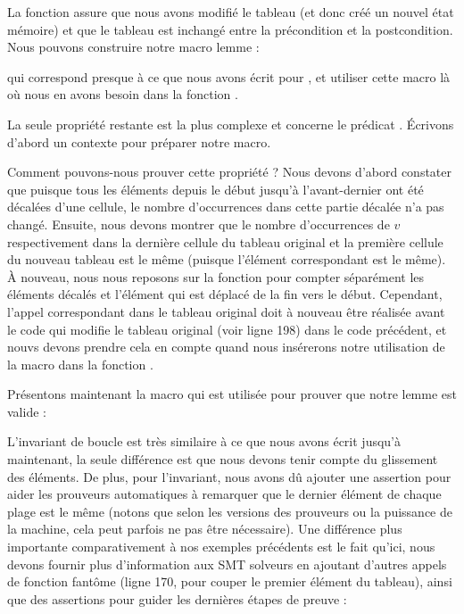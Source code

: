 

La fonction  assure que nous avons
modifié le tableau (et donc créé un nouvel état mémoire) et que le tableau est
inchangé entre la précondition et la postcondition. Nous pouvons construire
notre macro lemme :




qui correspond presque à ce que nous avons écrit pour ,
et utiliser cette macro là où nous en avons besoin dans la fonction
.




La seule propriété restante est la plus complexe et concerne le prédicat
. Écrivons d'abord un contexte pour préparer notre
macro.




Comment pouvons-nous prouver cette propriété ? Nous devons d'abord constater
que puisque tous les éléments depuis le début jusqu'à l'avant-dernier ont été
décalées d'une cellule, le nombre d'occurrences dans cette partie décalée n'a
pas changé. Ensuite, nous devons montrer que le nombre d'occurrences de $v$
respectivement dans la dernière cellule du tableau original et la première
cellule du nouveau tableau est le même (puisque l'élément correspondant est le
même). À nouveau, nous nous reposons sur la fonction  pour compter
séparément les éléments décalés et l'élément qui est déplacé de la fin vers le
début. Cependant, l'appel correspondant dans le tableau original doit à nouveau
être réalisée avant le code qui modifie le tableau original (voir ligne 198) dans
le code précédent, et nouvs devons prendre cela en compte quand nous insérerons
notre utilisation de la macro dans la fonction .


Présentons maintenant la macro qui est utilisée pour prouver que notre lemme
est valide :




L'invariant de boucle est très similaire à ce que nous avons écrit jusqu'à
maintenant, la seule différence est que nous devons tenir compte du glissement
des éléments. De plus, pour l'invariant, nous avons dû ajouter une assertion
pour aider les prouveurs automatiques à remarquer que le dernier élément de
chaque plage est le même (notons que selon les versions des prouveurs ou la
puissance de la machine, cela peut parfois ne pas être nécessaire). Une différence
plus importante comparativement à nos exemples précédents est le fait qu'ici, nous
devons fournir plus d'information aux SMT solveurs en ajoutant d'autres appels
de fonction fantôme (ligne 170, pour couper le premier élément du tableau), ainsi
que des assertions pour guider les dernières étapes de preuve :



